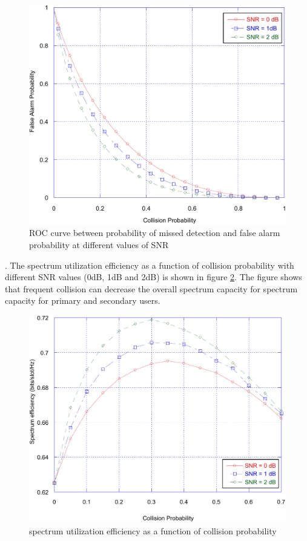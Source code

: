 \documentclass[twocolumn]{el-author}
\begin{document}
	\begin{figure}
		\centering
		\includegraphics[width=0.7\linewidth]{./fig2_err}
		\caption{ROC curve between probability of missed detection and false alarm probability at different values of SNR }
		\label{fig:fig2err}
	\end{figure}
	. The spectrum utilization efficiency as a function of collision probability with different SNR values (0dB, 1dB and 2dB) is shown in figure \ref{fig:fig7err}. The figure shows that frequent collision can decrease the overall spectrum capacity for spectrum capacity for primary and secondary users. 


\begin{figure}
	\centering
	\includegraphics[width=0.7\linewidth]{./fig7_err}
	\caption{spectrum utilization efficiency as a function of collision probability}
	\label{fig:fig7err}
\end{figure}
	
	
	
	

	
	
	
\end{document}
